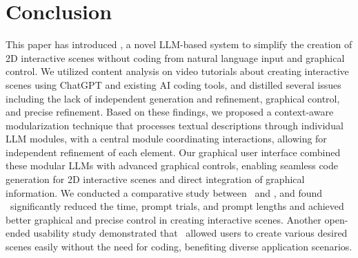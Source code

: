 \section{Conclusion}
This paper has introduced \sysName, a novel LLM-based system to simplify the creation of 2D interactive scenes without coding from natural language input and graphical control. We utilized content analysis on video tutorials about creating interactive scenes using ChatGPT and existing AI coding tools, and distilled several issues including the lack of independent generation and refinement, graphical control, and precise refinement. Based on these findings, we proposed a context-aware modularization technique that processes textual descriptions through individual LLM modules, with a central module coordinating interactions, allowing for independent refinement of each element. Our graphical user interface combined these modular LLMs with advanced graphical controls, enabling seamless code generation for 2D interactive scenes and direct integration of graphical information. We conducted a comparative study between \sysName~and , and found \sysName~significantly reduced the time, prompt trials, and prompt lengths and achieved better graphical and precise control in creating interactive scenes. Another open-ended usability study demonstrated that \sysName~allowed users to create various desired scenes easily without the need for coding, benefiting diverse application scenarios.